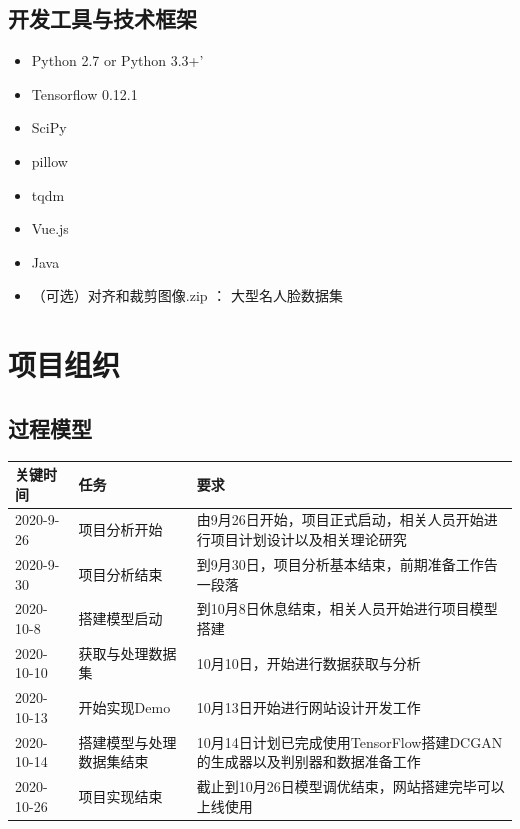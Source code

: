 \documentclass[hyperref, a4paper]{ctexart}
\begin{document}
\hypertarget{ux5f00ux53d1ux5de5ux5177ux4e0eux6280ux672fux6846ux67b6}{%
\subsection{开发工具与技术框架}\label{ux5f00ux53d1ux5de5ux5177ux4e0eux6280ux672fux6846ux67b6}}

\begin{itemize}
\item
  Python 2.7 or Python 3.3+'
\item
  Tensorflow 0.12.1
\item
  SciPy
\item
  pillow
\item
  tqdm
\item
  Vue.js
\item
  Java
\item
  （可选）对齐和裁剪图像.zip ： 大型名人脸数据集
\end{itemize}

\hypertarget{ux9879ux76eeux7ec4ux7ec7}{%
\section{项目组织}\label{ux9879ux76eeux7ec4ux7ec7}}

\hypertarget{ux8fc7ux7a0bux6a21ux578b}{%
\subsection{过程模型}\label{ux8fc7ux7a0bux6a21ux578b}}

\begin{table}[H]
\small 
\begin{center}  
\begin{tabular}{|p{1.5cm}|p{3cm}|p{5cm}|}  
\hline  
 关键时间 & 任务 & 要求  \\ \hline  
2020-9-26 & 项目分析开始 & 由9月26日开始，项目正式启动，相关人员开始进行项目计划设计以及相关理论研究\\  \hline
2020-9-30 & 项目分析结束 & 到9月30日，项目分析基本结束，前期准备工作告一段落\\  \hline
2020-10-8 & 搭建模型启动 & 到10月8日休息结束，相关人员开始进行项目模型搭建\\  \hline
2020-10-10 & 获取与处理数据集& 10月10日，开始进行数据获取与分析 \\  \hline  
2020-10-13 & 开始实现Demo& 10月13日开始进行网站设计开发工作 \\  \hline  
2020-10-14 & 搭建模型与处理数据集结束& 10月14日计划已完成使用TensorFlow搭建DCGAN的生成器以及判别器和数据准备工作 \\  \hline  
2020-10-26 & 项目实现结束 & 截止到10月26日模型调优结束，网站搭建完毕可以上线使用 \\ \hline  
\end{tabular}  
\end{center}  
\end{table}
\end{document}
